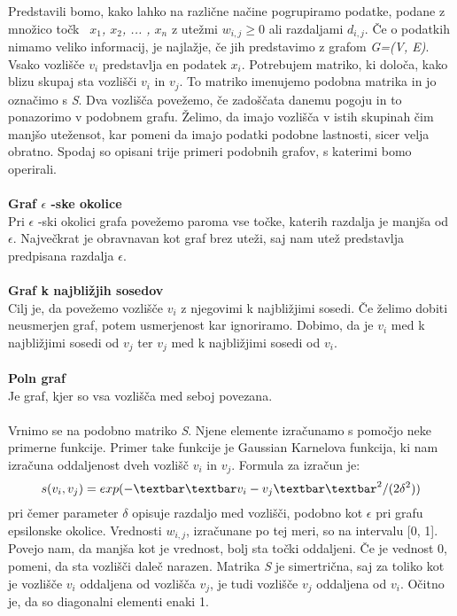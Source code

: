 \documentclass[a4paper, 10pt]{article}
\begin{document}
Predstavili bomo, kako lahko na različne načine pogrupiramo podatke, podane z množico točk \textsl{\ $x_1$, $x_2$, ... , $x_n$ } z utežmi \textsl{$w_{i,j}\geq 0$} ali razdaljami \textsl{$d_{i,j}$}. Če o podatkih nimamo veliko informacij, je najlažje, če jih predstavimo z grafom \textsl{G=(V, E)}. Vsako vozlišče $v_i$ predstavlja en podatek \textsl{$x_i$}. Potrebujem matriko, ki določa, kako blizu skupaj sta vozlišči $v_i$ in $v_j$. To matriko imenujemo podobna matrika in jo označimo s \textsl{S}. Dva vozlišča povežemo, če zadoščata danemu pogoju in to ponazorimo v podobnem grafu. Želimo, da imajo vozlišča v istih skupinah čim manjšo utežensot, kar pomeni da imajo podatki podobne lastnosti, sicer velja obratno. Spodaj so opisani trije primeri podobnih grafov, s katerimi bomo operirali.\\
\\
\textbf{Graf $\epsilon$ -ske okolice}\\
Pri $\epsilon$ -ski okolici grafa povežemo paroma vse točke, katerih razdalja je manjša od $\epsilon$. Največkrat je obravnavan kot graf brez uteži, saj nam utež predstavlja predpisana razdalja $\epsilon$.\\
\\
\textbf{Graf k najbližjih sosedov}\\
Cilj je, da povežemo vozlišče $v_i$ z njegovimi k najbližjimi sosedi. Če želimo dobiti neusmerjen graf, potem usmerjenost kar ignoriramo. Dobimo, da je $v_i$ med k najbližjimi sosedi od $v_j$ ter $v_j$ med k najbližjimi sosedi od $v_i$.\\
\\
\textbf{Poln graf}\\
Je graf, kjer so vsa vozlišča med seboj povezana.\\
\\
Vrnimo se na podobno matriko \textsl{S}. Njene elemente izračunamo s pomočjo neke primerne funkcije. Primer take funkcije je Gaussian Karnelova funkcija, ki nam izračuna oddaljenost dveh vozlišč $v_i$ in $v_j$. Formula za izračun je:$$s(v_i, v_j) = exp(-\textbar\textbar v_i - v_j \textbar\textbar^2 / (2\delta^2))$$pri čemer parameter $\delta$ opisuje razdaljo med vozlišči, podobno kot $\epsilon$ pri grafu epsilonske okolice.  Vrednosti $w_{i,j}$, izračunane po tej meri, so na intervalu [0, 1]. Povejo nam, da manjša kot je vrednost, bolj sta točki oddaljeni. Če je vednost 0, pomeni, da sta vozlišči daleč narazen. Matrika \textsl{S} je simertrična, saj za toliko kot je vozlišče $v_i$ oddaljena od vozlišča $v_j$, je tudi vozlišče $v_j$ oddaljena od $v_i$. Očitno je, da so diagonalni elementi enaki 1.
\end{document}
